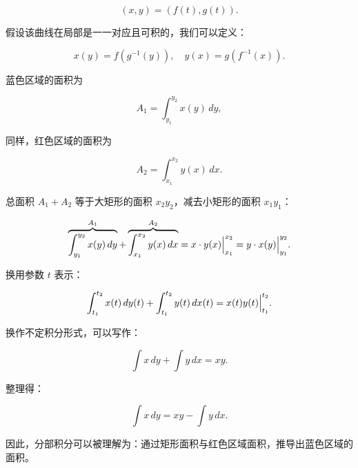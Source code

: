 $$
(x,y) = (f(t), g(t)).
$$

假设该曲线在局部是一一对应且可积的，我们可以定义：

$$
x(y) = f(g^{-1}(y)), \quad y(x) = g(f^{-1}(x)).
$$

蓝色区域的面积为

$$
A_{1} = \int_{y_{1}}^{y_{2}} x(y)\,dy,
$$

同样，红色区域的面积为

$$
A_{2} = \int_{x_{1}}^{x_{2}} y(x)\,dx.
$$

总面积 $A_1 + A_2$ 等于大矩形的面积 $x_{2}y_{2}$，减去小矩形的面积 $x_{1}y_{1}$：

$$
\overbrace{\int_{y_{1}}^{y_{2}} x(y)\,dy}^{A_{1}}
+ \overbrace{\int_{x_{1}}^{x_{2}} y(x)\,dx}^{A_{2}}
= \Bigl. x \cdot y(x) \Bigr|_{x_{1}}^{x_{2}}
= \Bigl. y \cdot x(y) \Bigr|_{y_{1}}^{y_{2}}.
$$

换用参数 $t$ 表示：

$$
\int_{t_{1}}^{t_{2}} x(t)\,dy(t) + \int_{t_{1}}^{t_{2}} y(t)\,dx(t) 
= \Bigl. x(t)y(t) \Bigr|_{t_{1}}^{t_{2}}.
$$

换作不定积分形式，可以写作：

$$
\int x\,dy + \int y\,dx = xy.
$$

整理得：

$$
\int x\,dy = xy - \int y\,dx.
$$

因此，分部积分可以被理解为：通过矩形面积与红色区域面积，推导出蓝色区域的面积。
